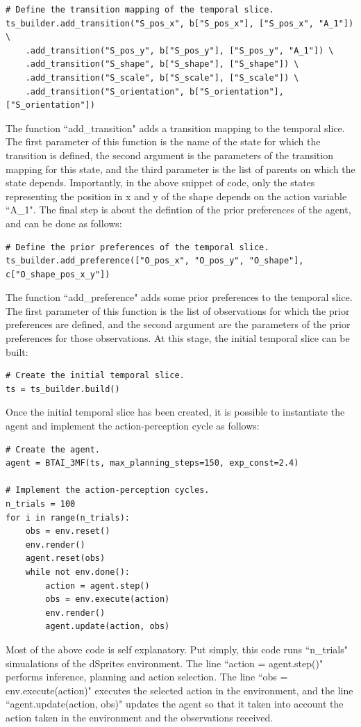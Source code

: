 \documentclass[twoside,11pt]{article}
\begin{document}
\begin{verbatim}
# Define the transition mapping of the temporal slice.
ts_builder.add_transition("S_pos_x", b["S_pos_x"], ["S_pos_x", "A_1"]) \
    .add_transition("S_pos_y", b["S_pos_y"], ["S_pos_y", "A_1"]) \
    .add_transition("S_shape", b["S_shape"], ["S_shape"]) \
    .add_transition("S_scale", b["S_scale"], ["S_scale"]) \
    .add_transition("S_orientation", b["S_orientation"], ["S_orientation"])
\end{verbatim}
The function ``add\_transition" adds a transition mapping to the temporal slice. The first parameter of this function is the name of the state for which the transition is defined, the second argument is the parameters of the transition mapping for this state, and the third parameter is the list of parents on which the state depends. Importantly, in the above snippet of code, only the states representing the position in x and y of the shape depends on the action variable ``A\_1". The final step is about the defintion of the prior preferences of the agent, and can be done as follows:
\begin{verbatim}
# Define the prior preferences of the temporal slice.
ts_builder.add_preference(["O_pos_x", "O_pos_y", "O_shape"], c["O_shape_pos_x_y"])
\end{verbatim}
The function ``add\_preference" adds some prior preferences to the temporal slice. The first parameter of this function is the list of observations for which the prior preferences are defined, and the second argument are the parameters of the prior preferences for those observations. At this stage, the initial temporal slice can be built:
\begin{verbatim}
# Create the initial temporal slice.
ts = ts_builder.build()
\end{verbatim}
Once the initial temporal slice has been created, it is possible to instantiate the agent and implement the action-perception cycle as follows: 
\begin{verbatim}
# Create the agent.
agent = BTAI_3MF(ts, max_planning_steps=150, exp_const=2.4)

# Implement the action-perception cycles.
n_trials = 100
for i in range(n_trials):
    obs = env.reset()
    env.render()
    agent.reset(obs)
    while not env.done():
        action = agent.step()
        obs = env.execute(action)
        env.render()
        agent.update(action, obs)
\end{verbatim}
Most of the above code is self explanatory. Put simply, this code runs ``n\_trials" simualations of the dSprites environment. The line ``action = agent.step()" performs inference, planning and action selection. The line ``obs = env.execute(action)" executes the selected action in the environment, and the line ``agent.update(action, obs)" updates the agent so that it taken into account the action taken in the environment and the observations received.
\end{document}

